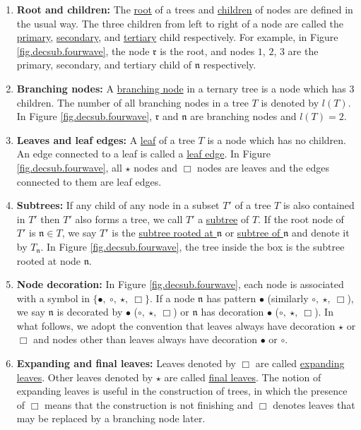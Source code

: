 \begin{defn}
\begin{enumerate}
 \item \textbf{Root and children:} The \underline{root} of a trees and \underline{children} of nodes are defined in the usual way. The three children from left to right of a node are called the \underline{primary}, \underline{secondary}, and \underline{tertiary} child respectively. For example, in Figure \ref{fig.decsub.fourwave}, the node $\mathfrak{r}$ is the root, and nodes $1$, $2$, $3$ are the primary, secondary, and tertiary child of $\mathfrak{n}$ respectively.
 \item \textbf{Branching nodes:} A \underline{branching node} in a ternary tree is a node which has $3$ children. The number of all branching nodes in a tree $T$ is denoted by $l(T)$. In Figure \ref{fig.decsub.fourwave}, $\mathfrak{r}$ and $\mathfrak{n}$ are branching nodes and $l(T)=2$.
 \item \textbf{Leaves and leaf edges:} A \underline{leaf} of a tree $T$ is a node which has no children. An edge connected to a leaf is called a \underline{leaf edge}. In Figure \ref{fig.decsub.fourwave}, all $\star$ nodes and $\Box$ nodes are leaves and the edges connected to them are leaf edges.
 \item \textbf{Subtrees:} If any child of any node in a subset $T'$ of a tree $T$ is also contained in $T'$ then $T' $ also forms a tree, we call $T'$ a \underline{subtree} of $T$. If the root node of $T'$ is $\mathfrak{n}\in T$, we say $T'$ is the \underline{subtree rooted at $\mathfrak{n}$} or \underline{subtree of $\mathfrak{n}$} and denote it by $T_\mathfrak{n}$. In Figure \ref{fig.decsub.fourwave}, the tree inside the box is the subtree rooted at node $\mathfrak{n}$.
 \item \textbf{Node decoration:} In Figure \ref{fig.decsub.fourwave}, each node is associated with a symbol in $\{\bullet,\ \circ,\ \star,\ \Box\}$. If a node $\mathfrak{n}$ has pattern $\bullet$ (similarly $ \circ,\ \star,\ \Box$), we say $\mathfrak{n}$ is decorated by $\bullet$ ($ \circ,\ \star,\ \Box$) or $\mathfrak{n}$ has decoration $\bullet$ ($ \circ,\ \star,\ \Box$). In what follows, we adopt the convention that leaves always have decoration $\star$ or $\Box$ and nodes other than leaves always have decoration $\bullet$ or $\circ$.
 
 \item \textbf{Expanding and final leaves:} Leaves denoted by $\Box$ are called \underline{expanding leaves}. Other leaves denoted by $\star$ are called \underline{final leaves}. The notion of expanding leaves is useful in the construction of trees, in which the presence of $\Box$ means that the construction is not finishing and $\Box$ denotes leaves that may be replaced by a branching node later.
 

\end{enumerate}
\end{defn}

